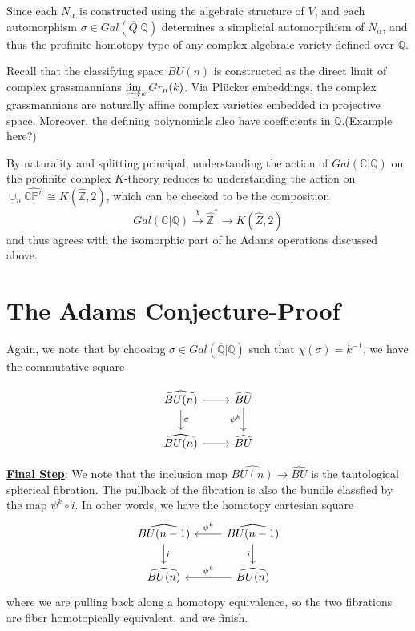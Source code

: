 \documentclass{article}
\theoremstyle{definition}
\theoremstyle{definition}
\theoremstyle{definition}
\theoremstyle{definition}
\theoremstyle{definition}
\theoremstyle{definition}
\theoremstyle{definition}
\begin{document}
Since each $N_{\alpha}$ is constructed using the algebraic structure of $V$, and each automorphism $\sigma\in Gal(\overline{Q}|\mathbb{Q})$ determines a simplicial automorpihism of $N_{\alpha}$, and thus the profinite homotopy type of any complex algebraic variety defined over $\mathbb{Q}$.

Recall that the classifying space $BU(n)$ is constructed as the direct limit of complex grassmannians $\varinjlim_{k}Gr_n(k)$. Via Pl\"{u}cker embeddings, the complex grassmannians are naturally affine complex varieties embedded in projective space. Moreover, the defining polynomials also have coefficients in $\mathbb{Q}$.(Example here?)


By naturality and splitting principal, understanding the action of $Gal(\mathbb{C}|\mathbb{Q})$ on the profinite complex $K$-theory reduces to understanding the action on $\cup_n \widehat{\mathbb{CP}^n}\cong K(\widehat{\mathbb{Z}},2)$, which can be checked to be the composition 
\[Gal(\mathbb{C}|\mathbb{Q})\xrightarrow{\chi} \widehat{\mathbb{Z}}^*\to K(\widehat{Z},2)\]
and thus agrees with the isomorphic part of he Adams operations discussed above. 

\section{The Adams Conjecture-Proof}
Again, we note that by choosing $\sigma\in Gal(\overline{\mathbb{Q}}|\mathbb{Q})$ such that $\chi(\sigma)=k^{-1}$, we have the commutative square

\[\begin{tikzcd}
	{\widehat{BU(n)}} & {\widehat{BU}} \\
	{\widehat{BU(n)}} & {\widehat{BU}}
	\arrow[from=1-1, to=1-2]
	\arrow["\sigma", from=1-1, to=2-1]
	\arrow["{\psi^k}"', from=1-2, to=2-2]
	\arrow[from=2-1, to=2-2]
\end{tikzcd}\]

\underline{\textbf{Final Step}}: We note that the inclusion map $\widehat{BU(n)}\to \widehat{BU}$ is the tautological spherical fibration. The pullback of the fibration is also the bundle classfied by the map $\psi^k\circ i$. In other words, we have the homotopy cartesian square 
\[\begin{tikzcd}
	{\widehat{BU(n-1)}} & {\widehat{BU(n-1)}} \\
	{\widehat{BU(n)}} & {\widehat{BU(n)}}
	\arrow["i", from=1-1, to=2-1]
	\arrow["{\psi^k}"', from=1-2, to=1-1]
	\arrow["i"', from=1-2, to=2-2]
	\arrow["{\psi^k}"', from=2-2, to=2-1]
\end{tikzcd}\]
where we are pulling back along a homotopy equivalence, so the two fibrations are fiber homotopically equivalent, and we finish. 
\end{document}
